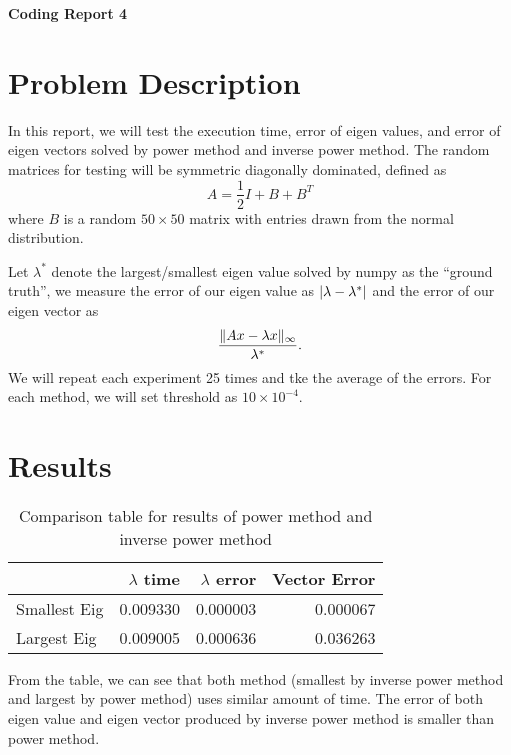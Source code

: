 \documentclass[a4paper,12pt]{article}
\begin{document}
\begin{center} %
	{\Large \bf Coding Report 4} %
	\vspace{2mm}
\end{center}  


\section{Problem Description}

In this report, we will test the execution time, error of eigen values, and error of eigen vectors
solved by power method and inverse power method.
The random matrices for testing will be symmetric diagonally dominated, defined as
$$
A = \frac{1}{2}I + B + B^{T}
$$
where $B$ is a random $50 \times 50$ matrix with entries drawn from the normal distribution.

Let $\lambda^*$ denote the largest/smallest eigen value solved by numpy as the ``ground truth'',
we measure the error of our eigen value as $\lvert\lambda - \lambda^*\rvert$
and the error of our eigen vector as
$$
\frac{\lVert Ax - \lambda x\rVert_{\infty}}{\lambda^*}.
$$
We will repeat each experiment 25 times and tke the average of the errors.
For each method, we will set threshold as $10 \times 10^{-4}$.

\section{Results}

\begin{table}[h]
\begin{center}

	\begin{tabular}{lrrr}
		\toprule
		{} &  $\lambda$ time &  $\lambda$ error &  Vector Error \\
		\midrule
		Smallest Eig &     0.009330 &      0.000003 &      0.000067 \\
		Largest Eig  &     0.009005 &      0.000636 &      0.036263 \\
		\bottomrule
		\end{tabular}
	\caption{Comparison table for results of power method and inverse power method}
\end{center}
\end{table}

From the table, we can see that both method (smallest by inverse power method and largest by power method)
uses similar amount of time.
The error of both eigen value and eigen vector produced by inverse power method is smaller than power method.
\end{document}
